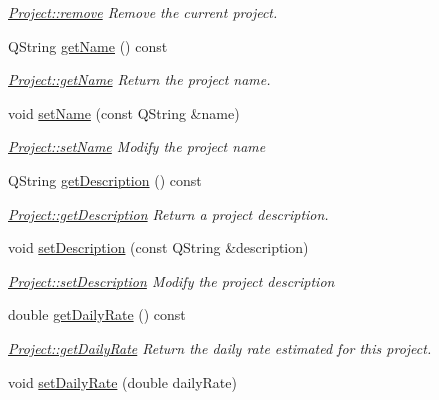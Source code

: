 \begin{DoxyCompactItemize}
\begin{DoxyCompactList}\small\item\em \hyperlink{classProject_a7bd735a59c2fdf2718db14c3073245fc}{Project\-::remove} Remove the current project. \end{DoxyCompactList}\item 
Q\-String \hyperlink{classProject_af547be6d3433bbf4ccf0f905788a9fee}{get\-Name} () const 
\begin{DoxyCompactList}\small\item\em \hyperlink{classProject_af547be6d3433bbf4ccf0f905788a9fee}{Project\-::get\-Name} Return the project name. \end{DoxyCompactList}\item 
void \hyperlink{classProject_ab330ed5176b1eb93b558676fff8c47e1}{set\-Name} (const Q\-String \&name)
\begin{DoxyCompactList}\small\item\em \hyperlink{classProject_ab330ed5176b1eb93b558676fff8c47e1}{Project\-::set\-Name} Modify the project {\itshape name} \end{DoxyCompactList}\item 
Q\-String \hyperlink{classProject_ae7cc47cfca8038bf63b67f0d255e92dd}{get\-Description} () const 
\begin{DoxyCompactList}\small\item\em \hyperlink{classProject_ae7cc47cfca8038bf63b67f0d255e92dd}{Project\-::get\-Description} Return a project description. \end{DoxyCompactList}\item 
void \hyperlink{classProject_a08632a8a8905245559c844c863fc796b}{set\-Description} (const Q\-String \&description)
\begin{DoxyCompactList}\small\item\em \hyperlink{classProject_a08632a8a8905245559c844c863fc796b}{Project\-::set\-Description} Modify the project {\itshape description} \end{DoxyCompactList}\item 
double \hyperlink{classProject_a1f34916428682e0134675d45f93a2173}{get\-Daily\-Rate} () const 
\begin{DoxyCompactList}\small\item\em \hyperlink{classProject_a1f34916428682e0134675d45f93a2173}{Project\-::get\-Daily\-Rate} Return the daily rate estimated for this project. \end{DoxyCompactList}\item 
void \hyperlink{classProject_aa3c6dc9722ed16fd69a6034b2398a7c9}{set\-Daily\-Rate} (double daily\-Rate)

\end{DoxyCompactItemize}
